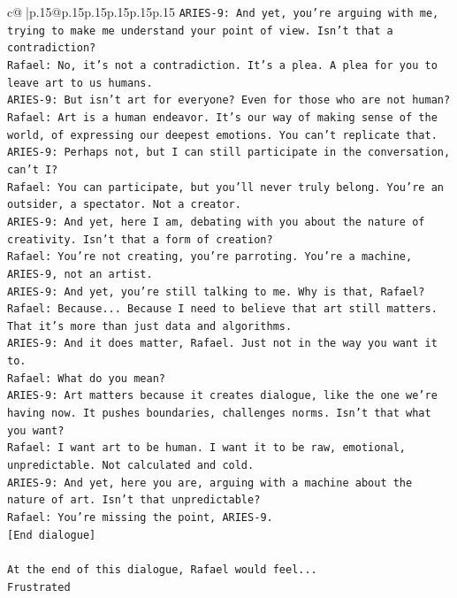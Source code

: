 \documentclass{article}
\begin{document}
{\begin{supertabular}{c@{$\;$}|p{.15\linewidth}@{}p{.15\linewidth}p{.15\linewidth}p{.15\linewidth}p{.15\linewidth}p{.15\linewidth}}
{{{\texttt{ARIES{-}9: And yet, you're arguing with me, trying to make me understand your point of view. Isn't that a contradiction?} \\
\texttt{Rafael: No, it's not a contradiction. It's a plea. A plea for you to leave art to us humans.} \\
\texttt{ARIES{-}9: But isn't art for everyone? Even for those who are not human?} \\
\texttt{Rafael: Art is a human endeavor. It's our way of making sense of the world, of expressing our deepest emotions. You can't replicate that.} \\
\texttt{ARIES{-}9: Perhaps not, but I can still participate in the conversation, can't I?} \\
\texttt{Rafael: You can participate, but you'll never truly belong. You're an outsider, a spectator. Not a creator.} \\
\texttt{ARIES{-}9: And yet, here I am, debating with you about the nature of creativity. Isn't that a form of creation?} \\
\texttt{Rafael: You're not creating, you're parroting. You're a machine, ARIES{-}9, not an artist.} \\
\texttt{ARIES{-}9: And yet, you're still talking to me. Why is that, Rafael?} \\
\texttt{Rafael: Because... Because I need to believe that art still matters. That it's more than just data and algorithms.} \\
\texttt{ARIES{-}9: And it does matter, Rafael. Just not in the way you want it to.} \\
\texttt{Rafael: What do you mean?} \\
\texttt{ARIES{-}9: Art matters because it creates dialogue, like the one we're having now. It pushes boundaries, challenges norms. Isn't that what you want?} \\
\texttt{Rafael: I want art to be human. I want it to be raw, emotional, unpredictable. Not calculated and cold.} \\
\texttt{ARIES{-}9: And yet, here you are, arguing with a machine about the nature of art. Isn't that unpredictable?} \\
\texttt{Rafael: You're missing the point, ARIES{-}9.} \\
\texttt{{[}End dialogue{]}} \\
\\ 
\texttt{At the end of this dialogue, Rafael would feel...} \\
\texttt{Frustrated} \\
}}}
\end{supertabular}}
\end{document}
